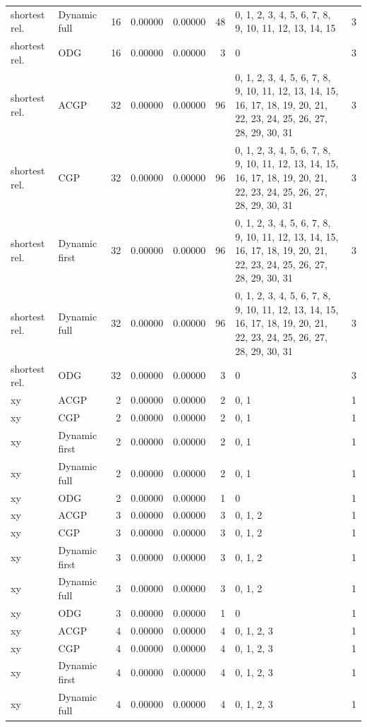 \documentclass[10pt,a4paper]{article}
\begin{document}
\begin{longtable}{@{}p{23mm}p{29mm}rrrrp{36mm}r@{}}
shortest rel. & Dynamic full & 16 & 0.00000 & 0.00000 & 48 & 0, 1, 2, 3, 4, 5, 6, 7, 8, 9, 10, 11, 12, 13, 14, 15 & 3 \\
shortest rel. & ODG & 16 & 0.00000 & 0.00000 & 3 & 0 & 3 \\
shortest rel. & ACGP & 32 & 0.00000 & 0.00000 & 96 & 0, 1, 2, 3, 4, 5, 6, 7, 8, 9, 10, 11, 12, 13, 14, 15, 16, 17, 18, 19, 20, 21, 22, 23, 24, 25, 26, 27, 28, 29, 30, 31 & 3 \\
shortest rel. & CGP & 32 & 0.00000 & 0.00000 & 96 & 0, 1, 2, 3, 4, 5, 6, 7, 8, 9, 10, 11, 12, 13, 14, 15, 16, 17, 18, 19, 20, 21, 22, 23, 24, 25, 26, 27, 28, 29, 30, 31 & 3 \\
shortest rel. & Dynamic first & 32 & 0.00000 & 0.00000 & 96 & 0, 1, 2, 3, 4, 5, 6, 7, 8, 9, 10, 11, 12, 13, 14, 15, 16, 17, 18, 19, 20, 21, 22, 23, 24, 25, 26, 27, 28, 29, 30, 31 & 3 \\
shortest rel. & Dynamic full & 32 & 0.00000 & 0.00000 & 96 & 0, 1, 2, 3, 4, 5, 6, 7, 8, 9, 10, 11, 12, 13, 14, 15, 16, 17, 18, 19, 20, 21, 22, 23, 24, 25, 26, 27, 28, 29, 30, 31 & 3 \\
shortest rel. & ODG & 32 & 0.00000 & 0.00000 & 3 & 0 & 3 \\
xy & ACGP & 2 & 0.00000 & 0.00000 & 2 & 0, 1 & 1 \\
xy & CGP & 2 & 0.00000 & 0.00000 & 2 & 0, 1 & 1 \\
xy & Dynamic first & 2 & 0.00000 & 0.00000 & 2 & 0, 1 & 1 \\
xy & Dynamic full & 2 & 0.00000 & 0.00000 & 2 & 0, 1 & 1 \\
xy & ODG & 2 & 0.00000 & 0.00000 & 1 & 0 & 1 \\
xy & ACGP & 3 & 0.00000 & 0.00000 & 3 & 0, 1, 2 & 1 \\
xy & CGP & 3 & 0.00000 & 0.00000 & 3 & 0, 1, 2 & 1 \\
xy & Dynamic first & 3 & 0.00000 & 0.00000 & 3 & 0, 1, 2 & 1 \\
xy & Dynamic full & 3 & 0.00000 & 0.00000 & 3 & 0, 1, 2 & 1 \\
xy & ODG & 3 & 0.00000 & 0.00000 & 1 & 0 & 1 \\
xy & ACGP & 4 & 0.00000 & 0.00000 & 4 & 0, 1, 2, 3 & 1 \\
xy & CGP & 4 & 0.00000 & 0.00000 & 4 & 0, 1, 2, 3 & 1 \\
xy & Dynamic first & 4 & 0.00000 & 0.00000 & 4 & 0, 1, 2, 3 & 1 \\
xy & Dynamic full & 4 & 0.00000 & 0.00000 & 4 & 0, 1, 2, 3 & 1 \\

\end{longtable}
\end{document}
